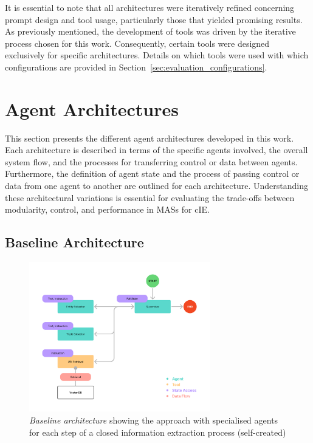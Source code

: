 \documentclass[a4paper,oneside,bibliography=totoc]{scrbook}
\begin{document}
It is essential to note that all architectures were iteratively refined concerning prompt design and tool usage, particularly those that yielded promising results. As previously mentioned, the development of tools was driven by the iterative process chosen for this work. Consequently, certain tools were designed exclusively for specific architectures. Details on which tools were used with which configurations are provided in Section~\ref{sec:evaluation_configurations}.

\section{Agent Architectures}
\label{sec:agent_architectures}

This section presents the different agent architectures developed in this work. Each architecture is described in terms of the specific agents involved, the overall system flow, and the processes for transferring control or data between agents. Furthermore, the definition of agent state and the process of passing control or data from one agent to another are outlined for each architecture. Understanding these architectural variations is essential for evaluating the trade-offs between modularity, control, and performance in \acp{MAS} for \ac{cIE}.

\subsection{Baseline Architecture}
\label{subsec:baseline}

\begin{figure}[tp]
  \centering
  \includegraphics[width=0.7\textwidth]{figures/Baseline Architecture.png}
  \caption[\textit{Baseline architecture} showing the approach with specialised agents for each step of a closed information extraction process]{\textit{Baseline architecture} showing the approach with specialised agents for each step of a closed information extraction process (self-created)}
  \label{fig:baseline_architecture}
\end{figure}
\end{document}
